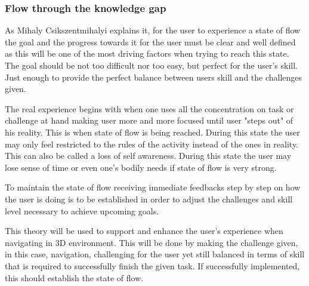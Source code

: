 \subsubsection{Flow through the knowledge gap}

As Mihaly Csikszentmihalyi explains it, for the user to experience a state of flow the goal and the progress towards it for the user must be clear and well defined as this will be one of the most driving factors when trying to reach this state. The goal should be not too difficult nor too easy, but perfect for the user’s skill. Just enough to provide the perfect balance between users skill and the challenges given.
	
The real experience 	begins with when one uses all the concentration on task or challenge at hand making user more and more focused until user "steps out" of his reality. This is when state of flow is being reached. During this state the user may only feel 	restricted to the rules of the activity instead of the ones in reality. This can also be called a loss of self awareness. During this state the user may lose sense of time or even one’s bodily 	needs if state of flow is very strong. 	
	
To maintain the state of flow receiving immediate feedbacks step by step on how the user is doing is to be established in order to adjust the challenges and skill level necessary to achieve upcoming goals.   

	This theory will be used to support and enhance the user’s experience when navigating in 3D environment. This will be done by making the challenge given, in this case, navigation, challenging for the user yet still balanced in terms of skill that is required to successfully finish the given task. If successfully implemented, this should establish the state of flow.  
